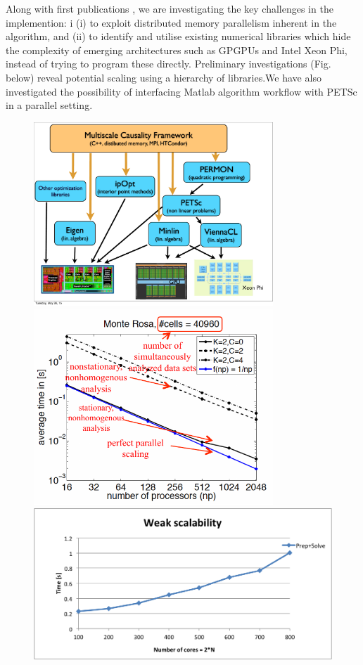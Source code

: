 \documentclass[a0,portrait]{a0poster}
\begin{document}
\begin{multicols}{2}
\vspace{-0.5cm}
\noindent

{\large Along with first publications \cite{horenko_pnas_2014,gagliardini_econometrica_2015}, we are investigating the key challenges in the implemention: i (i) to exploit distributed memory parallelism inherent in the algorithm, and (ii) to identify and utilise existing numerical libraries which hide the complexity of emerging architectures such as GPGPUs and Intel Xeon Phi, instead of trying to program these directly.  Preliminary investigations (Fig. below) reveal potential scaling using a hierarchy of libraries.We have also investigated the possibility of interfacing Matlab algorithm workflow with PETSc in a parallel setting.}

\begin{figure}[H]
\begin{center} \centerline{
\includegraphics[width=9cm]{Library_Hierarchy.pdf}
\includegraphics[width=9cm]{Scaling.pdf}
\includegraphics[width=14cm]{FLLOP_weak_scalability.png}}

\end{center}
\end{figure}
\end{multicols}
\end{document}
